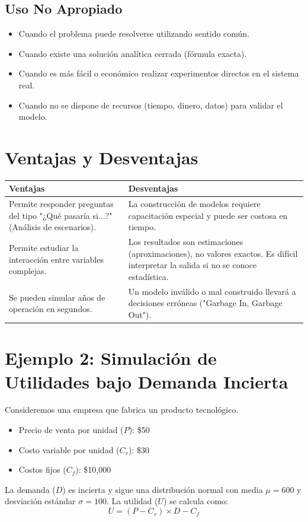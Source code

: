 \documentclass[11pt, letterpaper]{article}
\begin{document}
\subsection{Uso No Apropiado}
\begin{itemize}
    \item Cuando el problema puede resolverse utilizando sentido común.
    \item Cuando existe una solución analítica cerrada (fórmula exacta).
    \item Cuando es más fácil o económico realizar experimentos directos en el sistema real.
    \item Cuando no se dispone de recursos (tiempo, dinero, datos) para validar el modelo.
\end{itemize}

\section{Ventajas y Desventajas}

\begin{table}[h]
\centering
\begin{tabular}{@{}p{}p{}@{}}
\toprule
\textbf{Ventajas} & \textbf{Desventajas} \\ \midrule
Permite responder preguntas del tipo "¿Qué pasaría si...?" (Análisis de escenarios). & La construcción de modelos requiere capacitación especial y puede ser costosa en tiempo. \\
Permite estudiar la interacción entre variables complejas. & Los resultados son estimaciones (aproximaciones), no valores exactos. Es difícil interpretar la salida si no se conoce estadística. \\
Se pueden simular años de operación en segundos. & Un modelo inválido o mal construido llevará a decisiones erróneas ("Garbage In, Garbage Out"). \\ \bottomrule
\end{tabular}
\end{table}

\section{Ejemplo 2: Simulación de Utilidades bajo Demanda Incierta}

Consideremos una empresa que fabrica un producto tecnológico. 
\begin{itemize}
    \item Precio de venta por unidad ($P$): \$50
    \item Costo variable por unidad ($C_v$): \$30
    \item Costos fijos ($C_f$): \$10,000
\end{itemize}
La demanda ($D$) es incierta y sigue una distribución normal con media $\mu = 600$ y desviación estándar $\sigma = 100$.
La utilidad ($U$) se calcula como:
\[ U = (P - C_v) \times D - C_f \]
\end{document}
